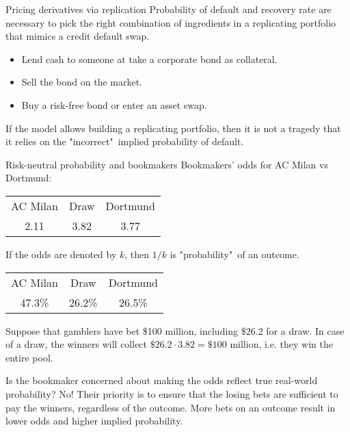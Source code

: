 \documentclass{beamer}
\begin{document}
\begin{frame}{Pricing derivatives via replication}
\justify
Probability of default and recovery rate are necessary to pick the right combination of ingredients in a replicating portfolio that mimics a credit default swap.

\justify
\begin{itemize}
\justifying
\item Lend cash to someone at take a corporate bond as collateral.
\item Sell the bond on the market.
\item Buy a risk-free bond or enter an asset swap.
\end{itemize}

\justify
If the model allows building a replicating portfolio, then it is not a tragedy that it relies on the "incorrect"\ implied probability of default.
\end{frame}



\begin{frame}{Risk-neutral probability and bookmakers}
\justify
Bookmakers' odds for AC Milan vs Dortmund:

\centering
\begin{tabular}{c|c|c}
AC Milan & Draw & Dortmund \\
2.11 & 3.82 & 3.77
\end{tabular}

\justify
If the odds are denoted by $k$, then $1/k$ is "probability"\ of an outcome.

\centering
\begin{tabular}{c|c|c}
AC Milan & Draw & Dortmund \\
47.3\% & 26.2\% & 26.5\%
\end{tabular}

\justify
Suppose that gamblers have bet \$100 million, including \$26.2 for a draw. In case of a draw, the winners will collect $\$26.2 \cdot 3.82 = \$100$ million, i.e. they win the entire pool.

\justify
Is the bookmaker concerned about making the odds reflect true real-world probability? No! Their priority is to ensure that the losing bets are sufficient to pay the winners, regardless of the outcome. More bets on an outcome result in lower odds and higher implied probability.
\end{frame}
\end{document}
